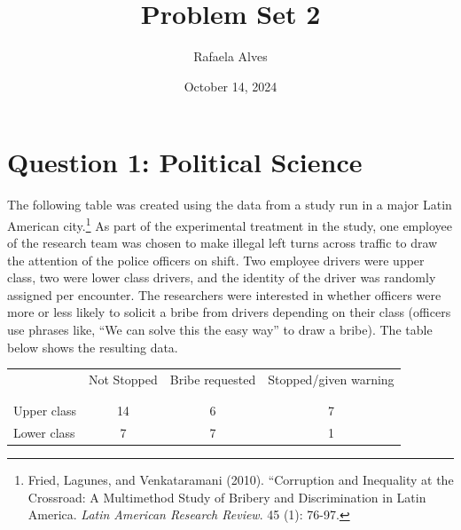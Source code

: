 \documentclass[12pt,letterpaper]{article}
\title{Problem Set 2}
\date{October 14, 2024}
\author{Rafaela Alves}
\begin{document}
		\maketitle
	\vspace{.5cm}

	\section*{Question 1: Political Science}
		\vspace{.5cm}
	The following table was created using the data from a study run in a major Latin American city.\footnote{Fried, Lagunes, and Venkataramani (2010). ``Corruption and Inequality at the Crossroad: A Multimethod Study of Bribery and Discrimination in Latin America. \textit{Latin American Research Review}. 45 (1): 76-97.} As part of the experimental treatment in the study, one employee of the research team was chosen to make illegal left turns across traffic to draw the attention of the police officers on shift. Two employee drivers were upper class, two were lower class drivers, and the identity of the driver was randomly assigned per encounter. The researchers were interested in whether officers were more or less likely to solicit a bribe from drivers depending on their class (officers use phrases like, ``We can solve this the easy way'' to draw a bribe). The table below shows the resulting data.


\begin{table}[h!]
	\centering
	\begin{tabular}{l | c c c }
		& Not Stopped & Bribe requested & Stopped/given warning \\
		\\[-1.8ex] 
		\hline \\[-1.8ex]
		Upper class & 14 & 6 & 7 \\
		Lower class & 7 & 7 & 1 \\
		\hline
	\end{tabular}
\end{table}
\end{document}
